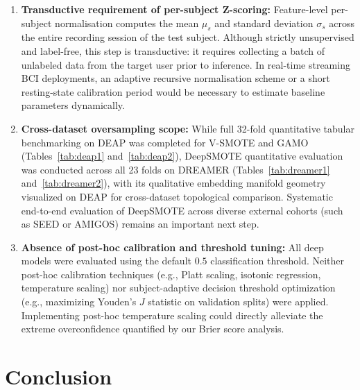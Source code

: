 \documentclass[a4paper,fleqn]{cas-sc}
\begin{document}
\begin{enumerate}
    \item \textbf{Transductive requirement of per-subject Z-scoring:} Feature-level per-subject normalisation computes the mean $\mu_s$ and standard deviation $\sigma_s$ across the entire recording session of the test subject. Although strictly unsupervised and label-free, this step is transductive: it requires collecting a batch of unlabeled data from the target user prior to inference. In real-time streaming BCI deployments, an adaptive recursive normalisation scheme or a short resting-state calibration period would be necessary to estimate baseline parameters dynamically.

    \item \textbf{Cross-dataset oversampling scope:} While full 32-fold quantitative tabular benchmarking on DEAP was completed for V-SMOTE and GAMO (Tables~\ref{tab:deap1} and~\ref{tab:deap2}), DeepSMOTE quantitative evaluation was conducted across all 23 folds on DREAMER (Tables~\ref{tab:dreamer1} and~\ref{tab:dreamer2}), with its qualitative embedding manifold geometry visualized on DEAP for cross-dataset topological comparison. Systematic end-to-end evaluation of DeepSMOTE across diverse external cohorts (such as SEED or AMIGOS) remains an important next step.

    \item \textbf{Absence of post-hoc calibration and threshold tuning:} All deep models were evaluated using the default $0.5$ classification threshold. Neither post-hoc calibration techniques (e.g., Platt scaling, isotonic regression, temperature scaling) nor subject-adaptive decision threshold optimization (e.g., maximizing Youden's $J$ statistic on validation splits) were applied. Implementing post-hoc temperature scaling could directly alleviate the extreme overconfidence quantified by our Brier score analysis.
\end{enumerate}

\FloatBarrier
\section{Conclusion}
\label{sec:conclusion}
\end{document}
